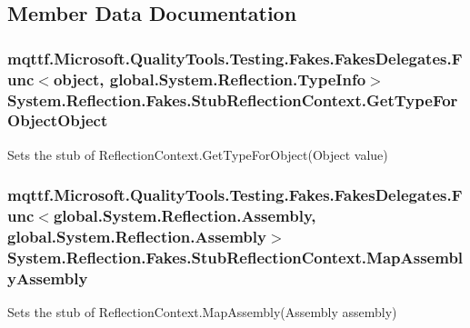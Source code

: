 \subsection{Member Data Documentation}
\hypertarget{class_system_1_1_reflection_1_1_fakes_1_1_stub_reflection_context_ae480a6930b54dbc0f5b639fc78af2e8f}{
\subsubsection[{Get\-Type\-For\-Object\-Object}]{\setlength{\rightskip}{0pt plus 5cm}mqttf.\-Microsoft.\-Quality\-Tools.\-Testing.\-Fakes.\-Fakes\-Delegates.\-Func$<$object, global.\-System.\-Reflection.\-Type\-Info$>$ System.\-Reflection.\-Fakes.\-Stub\-Reflection\-Context.\-Get\-Type\-For\-Object\-Object}}\label{class_system_1_1_reflection_1_1_fakes_1_1_stub_reflection_context_ae480a6930b54dbc0f5b639fc78af2e8f}


Sets the stub of Reflection\-Context.\-Get\-Type\-For\-Object(\-Object value)

\hypertarget{class_system_1_1_reflection_1_1_fakes_1_1_stub_reflection_context_a537f67b1a2c6401bef53182705d44eb3}{
\subsubsection[{Map\-Assembly\-Assembly}]{\setlength{\rightskip}{0pt plus 5cm}mqttf.\-Microsoft.\-Quality\-Tools.\-Testing.\-Fakes.\-Fakes\-Delegates.\-Func$<$global.\-System.\-Reflection.\-Assembly, global.\-System.\-Reflection.\-Assembly$>$ System.\-Reflection.\-Fakes.\-Stub\-Reflection\-Context.\-Map\-Assembly\-Assembly}}\label{class_system_1_1_reflection_1_1_fakes_1_1_stub_reflection_context_a537f67b1a2c6401bef53182705d44eb3}


Sets the stub of Reflection\-Context.\-Map\-Assembly(\-Assembly assembly)

